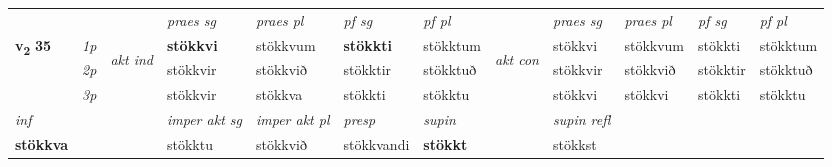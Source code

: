 \begin{longtable}[l]{X>{\footnotesize\itshape}llXXXXlXXXX}
\midrule

 & &   & \textit{praes sg}  & \textit{praes pl}    & \textit{ pf sg} & \textit{pf pl} & & \textit{praes sg}  & \textit{praes pl}    & \textit{pf sg} & \textit{pf pl }  \\ \cmidrule{4-7} \cmidrule{9-12}
 \multirow{2}{*}{{{\textbf{v{\textsubscript{2}}} \Large{\textbf{35}}}}}  & 1p & \multirow{3}{*}{\begin{turn}{90}\textit{akt ind}\end{turn}} & \textbf{stökkvi} & stökkvum & \textbf{stökkti} & stökktum & \multirow{3}{*}{\begin{turn}{90}\textit{akt con}\end{turn}} &stökkvi & stökkvum & stökkti & stökktum\\*
 & 2p &  &  stökkvir  & stökkvið & stökktir & stökktuð & & stökkvir & stökkvið & stökktir & stökktuð \\*
 & 3p &  & stökkvir & stökkva & stökkti & stökktu & & stökkvi & stökkvi& stökkti & stökktu \\*
\cmidrule{4-7} \cmidrule{9-12}

   {\textit{inf}} & &  & \textit{imper akt sg} & \textit{imper akt pl}   & \textit{presp} & \textit{supin} && \textit{supin refl}  \\*
  {\textbf{stökkva}} & && stökktu  & stökkvið   & stökkvandi &  \textbf{stökkt} && stökkst  \\*

\midrule


\end{longtable}
